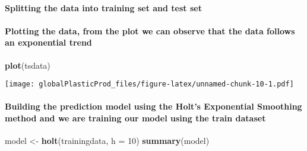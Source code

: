 \documentclass[
]{article}
\newenvironment{Shaded}{\begin{snugshade}}{\end{snugshade}}
\newcommand{\DataTypeTok}[1]{\textcolor[rgb]{0.13,0.29,0.53}{#1}}
\newcommand{\DecValTok}[1]{\textcolor[rgb]{0.00,0.00,0.81}{#1}}
\newcommand{\KeywordTok}[1]{\textcolor[rgb]{0.13,0.29,0.53}{\textbf{#1}}}
\newcommand{\NormalTok}[1]{#1}
\newcommand{\OperatorTok}[1]{\textcolor[rgb]{0.81,0.36,0.00}{\textbf{#1}}}
\newcommand{\StringTok}[1]{\textcolor[rgb]{0.31,0.60,0.02}{#1}}
\begin{document}
\hypertarget{splitting-the-data-into-training-set-and-test-set}{%
\paragraph{Splitting the data into training set and test
set}\label{splitting-the-data-into-training-set-and-test-set}}

\begin{Shaded}
\end{Shaded}

\hypertarget{plotting-the-data-from-the-plot-we-can-observe-that-the-data-follows-an-exponential-trend}{%
\paragraph{Plotting the data, from the plot we can observe that the data
follows an exponential
trend}\label{plotting-the-data-from-the-plot-we-can-observe-that-the-data-follows-an-exponential-trend}}

\begin{Shaded}
\begin{Highlighting}[]
\KeywordTok{plot}\NormalTok{(tsdata)}
\end{Highlighting}
\end{Shaded}

\texttt{[image: globalPlasticProd\_files/figure-latex/unnamed-chunk-10-1.pdf]}

\hypertarget{building-the-prediction-model-using-the-holts-exponential-smoothing-method-and-we-are-training-our-model-using-the-train-dataset}{%
\paragraph{Building the prediction model using the Holt's Exponential
Smoothing method and we are training our model using the train
dataset}\label{building-the-prediction-model-using-the-holts-exponential-smoothing-method-and-we-are-training-our-model-using-the-train-dataset}}

\begin{Shaded}
\begin{Highlighting}[]
\NormalTok{model \textless{}{-}}\StringTok{ }\KeywordTok{holt}\NormalTok{(trainingdata, }\DataTypeTok{h =} \DecValTok{10}\NormalTok{)}
\KeywordTok{summary}\NormalTok{(model)}
\end{Highlighting}
\end{Shaded}
\end{document}
